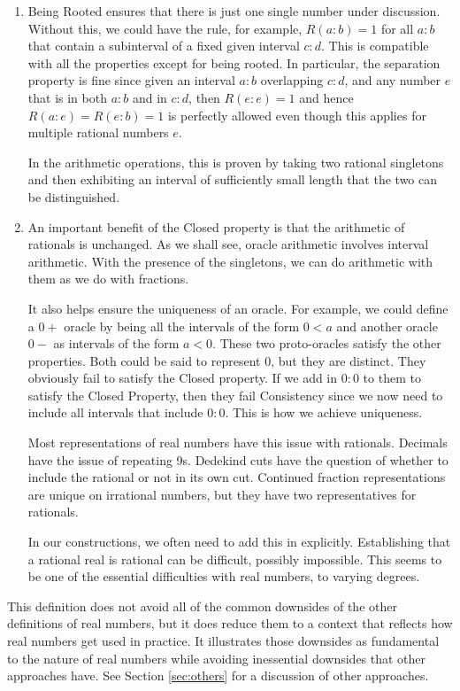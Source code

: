 \documentclass[12pt]{article}
\begin{document}
\begin{enumerate}
    \item Being Rooted ensures that there is just one single number under discussion. Without this, we could have the rule, for example, $R(a:b) = 1$ for all $a:b$ that contain a subinterval of a fixed given interval $c:d$. This is compatible with all the properties except for being rooted. In particular, the separation property is fine since given an interval $a:b$ overlapping  $c:d$, and any number $e$ that is in both $a:b$ and in $c:d$, then $R(e:e) = 1$ and hence $R(a:e)=R(e:b) = 1$ is perfectly allowed even though this applies for multiple rational numbers $e$.
    
    In the arithmetic operations, this is proven by taking two rational singletons and then exhibiting an interval of sufficiently small length that the two can be distinguished. 

    \item An important benefit of the Closed property is that the arithmetic of rationals is unchanged. As we shall see, oracle arithmetic involves interval arithmetic. With the presence of the singletons, we can do arithmetic with them as we do with fractions. 
    
    It also helps ensure the uniqueness of an oracle. For example, we could define a $0+$ oracle by being all the intervals of the form $0\lt a$ and another oracle $0-$ as intervals of the form $a \lt 0$. These two proto-oracles satisfy the other properties. Both could be said to represent $0$, but they are distinct. They obviously fail to satisfy the Closed property. If we add in $0:0$ to them to satisfy the Closed Property, then they fail Consistency since we now need to include all intervals that include $0:0$. This is how we achieve uniqueness. 
    
    Most representations of real numbers have this issue with rationals. Decimals have the issue of repeating 9s. Dedekind cuts have the question of whether to include the rational or not in its own cut. Continued fraction representations are unique on irrational numbers, but they have two representatives for rationals. 
    
    In our constructions, we often need to add this in explicitly. Establishing that a rational real is rational can be difficult, possibly impossible. This seems to be one of the essential difficulties with real numbers, to varying degrees.

\end{enumerate}


This definition does not avoid all of the common downsides of the other definitions of real numbers, but it does reduce them to a context that reflects how real numbers get used in practice. It illustrates those downsides as fundamental to the nature of real numbers while avoiding inessential downsides that other approaches have. See Section \ref{sec:others} for a discussion of other approaches.  
\end{document}
